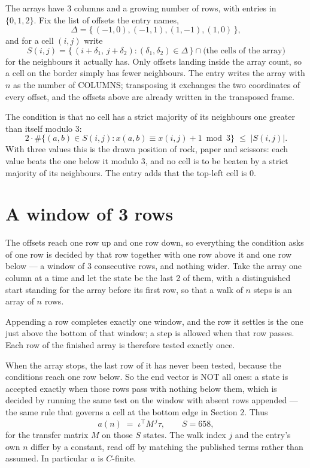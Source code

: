 \documentclass[11pt,a4paper]{article}
\theoremstyle{plain}
\theoremstyle{definition}
\begin{document}
The arrays have $3$ columns and a growing number of rows, with entries in $\{0,1,2\}$. Fix the
list of offsets the entry names,
\[
\Delta=\{\,(-1,0), (-1,1), (1,-1), (1,0)\,\},
\]
and for a cell $(i,j)$ write
\[
S(i,j)=\{\,(i+\delta_1,\,j+\delta_2) : (\delta_1,\delta_2)\in\Delta\,\}\cap
\text{(the cells of the array)}
\]
for the neighbours it actually has. Only offsets landing inside the array count, so a cell on
the border simply has fewer neighbours. The entry writes the array with $n$ as the number of COLUMNS; transposing it exchanges the two coordinates of every offset, and the offsets above are already written in the transposed frame.

The condition is that no cell has a strict majority of its neighbours one greater than itself modulo $3$:
\[
2\cdot\#\{(a,b)\in S(i,j) : x(a,b)\equiv x(i,j)+1 \bmod 3\}\;\le\;|S(i,j)| .
\]
With three values this is the drawn position of rock, paper and scissors: each value beats the one below it modulo $3$, and no cell is to be beaten by a strict majority of its neighbours. The entry adds that the top-left cell is $0$.

\section{A window of 3 rows}

The offsets reach one row up and one row down, so everything the condition asks of one row is
decided by that row together with one row above it and one row below --- a window of
$3$ consecutive rows, and nothing wider. Take the array one column at a time
and let the state be the last 2 of them, with a distinguished start standing for the
array before its first row, so that a walk of $n$ steps is an array of $n$ rows.

Appending a row completes exactly one window, and the row it settles is the one just above the bottom of that window; a step is
allowed when that row passes. Each row of the finished
array is therefore tested exactly once.

When the array stops, the last row of it has never been tested, because the
conditions reach one row below. So the end vector is NOT all ones: a state is accepted exactly when
those rows pass with nothing below them, which is decided by running the same test on the window
with absent rows appended --- the same rule that governs a cell at the bottom edge in
Section 2.
Thus
\[
a(n)\;=\;\iota^{\!\top}M^{\,j}\tau ,\qquad S=658,
\]
for the transfer matrix $M$ on those $S$ states. The walk index $j$ and the entry's own $n$
differ by a constant, read off by matching the published terms rather than assumed. In
particular $a$ is $C$-finite.
\end{document}
